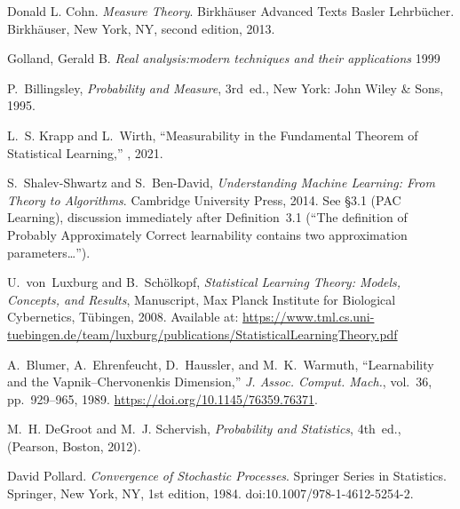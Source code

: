 \begin{thebibliography}{999}

    Donald L. Cohn.
    \textit{Measure Theory}.
    Birkhäuser Advanced Texts Basler Lehrbücher.
    Birkhäuser, New York, NY, second edition, 2013.

    Golland, Gerald B.
    \textit{Real analysis:modern techniques and their applications}
    1999

    P.~Billingsley, \emph{Probability and Measure}, 3rd~ed., New York: John Wiley \& Sons, 1995.

    L.~S. Krapp and L.~Wirth,
    \newblock ``Measurability in the Fundamental Theorem of Statistical Learning,''
    , 2021.

    S.~Shalev\hyp{}Shwartz and S.~Ben\hyp{}David,
    \emph{Understanding Machine Learning: From Theory to Algorithms}.
    Cambridge University Press, 2014.
    See \S3.1 (PAC Learning), discussion immediately after Definition~3.1
    (“The definition of Probably Approximately Correct learnability contains two approximation parameters…”).

    U.~von~Luxburg and B.~Sch{\"o}lkopf,
    \emph{Statistical Learning Theory: Models, Concepts, and Results},
    Manuscript, Max Planck Institute for Biological Cybernetics, T{\"u}bingen, 2008.
    Available at: \url{https://www.tml.cs.uni-tuebingen.de/team/luxburg/publications/StatisticalLearningTheory.pdf}

    A.~Blumer, A.~Ehrenfeucht, D.~Haussler, and M.~K.~Warmuth,
    ``Learnability and the Vapnik--Chervonenkis Dimension,''
    \emph{J. Assoc. Comput. Mach.}, vol.~36, pp.~929--965, 1989.
    \url{https://doi.org/10.1145/76359.76371}.

    M.~H. DeGroot and M.~J. Schervish, \textit{Probability and Statistics}, 4th~ed., (Pearson, Boston, 2012).

    David Pollard.
    \newblock \emph{Convergence of Stochastic Processes}.
    \newblock Springer Series in Statistics. Springer, New York, NY, 1st edition, 1984.
    \newblock doi:10.1007/978-1-4612-5254-2.


\end{thebibliography}
